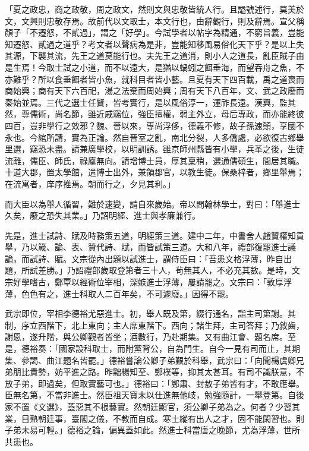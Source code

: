\begin{pinyinscope}
 「夏之政忠，商之政敬，周之政文，然則文與忠敬皆統人行。且謚號述行，莫美於文，文興則忠敬存焉。故前代以文取士，本文行也，由辭觀行，則及辭焉。宣父稱顏子「不遷怒，不貳過」，謂之「好學」。今試學者以帖字為精通，不窮旨義，豈能知遷怒、貳過之道乎？考文者以聲病為是非，豈能知移風易俗化天下乎？是以上失其源，下襲其流，先王之道莫能行也。夫先王之道消，則小人之道長，亂臣賊子由是生焉！今取士試之小道，而不以遠大，是猶以蝸蚓之餌垂海，而望吞舟之魚，不亦難乎？所以食垂餌者皆小魚，就科目者皆小藝。且夏有天下四百載，禹之道喪而商始興；商有天下六百祀，湯之法棄而周始興；周有天下八百年，文、武之政廢而秦始並焉。三代之選士任賢，皆考實行，是以風俗淳一，運祚長遠。漢興，監其然，尊儒術，尚名節，雖近戚竊位，強臣擅權，弱主外立，母后專政，而亦能終彼四百，豈非學行之效邪？魏、晉以來，專尚浮侈，德義不修，故子孫速顛，享國不永也。今綰所請，實為正論。然自晉室之亂，南北分裂，人多僑處，必欲復古鄉舉里選，竊恐未盡。請兼廣學校，以明訓誘。雖京師州縣皆有小學，兵革之後，生徒流離，儒臣、師氏，祿廩無向。請增博士員，厚其稟稍，選通儒碩生，間居其職。十道大郡，置太學館，遣博士出外，兼領郡官，以教生徒。保桑梓者，鄉里舉焉；在流寓者，庠序推焉。朝而行之，夕見其利。」



 而大臣以為舉人循習，難於速變，請自來歲始。帝以問翰林學士，對曰：「舉進士久矣，廢之恐失其業。」乃詔明經、進士與孝廉兼行。



 先是，進士試詩、賦及時務策五道，明經策三道。建中二年，中書舍人趙贊權知貢舉，乃以箴、論、表、贊代詩、賦，而皆試策三道。大和八年，禮部復罷進士議論，而試詩、賦。文宗從內出題以試進士，謂侍臣曰：「吾患文格浮薄，昨自出題，所試差勝。」乃詔禮部歲取登第者三十人，茍無其人，不必充其數。是時，文宗好學嗜古，鄭覃以經術位宰相，深嫉進士浮薄，屢請罷之。文宗曰：「敦厚浮薄，色色有之，進士科取人二百年矣，不可遽廢。」因得不罷。



 武宗即位，宰相李德裕尤惡進士。初，舉人既及第，綴行通名，詣主司第謝。其制，序立西階下，北上東向；主人席東階下。西向；諸生拜，主司答拜；乃敘齒，謝恩，遂升階，與公卿觀者皆坐；酒數行，乃赴期集。又有曲江會、題名席。至是，德裕奏：「國家設科取士，而附黨背公，自為門生。自今一見有司而止，其期集、參謁、曲江題名皆罷。」德裕嘗論公卿子弟艱於科舉，武宗曰：「向聞楊虞卿兄弟朋比貴勢，妨平進之路。昨黜楊知至、鄭樸等，抑其太甚耳。有司不識朕意，不放子弟，即過矣，但取實藝可也。」德裕曰：「鄭肅、封敖子弟皆有才，不敢應舉。臣無名第，不當非進士。然臣祖天寶末以仕進無他岐，勉強隨計，一舉登第。自後家不置《文選》，蓋惡其不根藝實。然朝廷顯官，須公卿子弟為之。何者？少習其業，目熟朝廷事，臺閣之儀，不教而自成。寒士縱有出人之才，固不能閑習也。則子弟未易可輕。」德裕之論，偏異蓋如此。然進士科當唐之晚節，尤為浮薄，世所共患也。




\end{pinyinscope}
